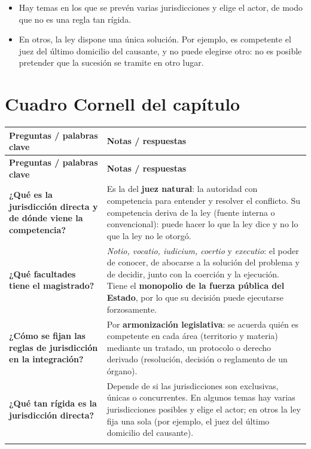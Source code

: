 \documentclass[12pt,oneside]{book}
\makeatletter
\newenvironment{cornell}{%
    \begin{longtable}{@{}>{\raggedright\arraybackslash}p{0.28\textwidth}>{\raggedright\arraybackslash}p{0.67\textwidth}@{}}
    \toprule
    \textbf{Preguntas / palabras clave} & \textbf{Notas / respuestas} \\
    \midrule
    \endfirsthead
    \toprule
    \textbf{Preguntas / palabras clave} & \textbf{Notas / respuestas} \\
    \midrule
    \endhead
}{%
    \end{longtable}
}
\newcommand{\cornellrow}[2]{\textbf{#1} & #2 \\[0.6em]}
\newcommand{\cornellresumen}[1]{%
    \midrule
    \multicolumn{2}{@{}p{\dimexpr0.95\textwidth+2\tabcolsep\relax}@{}}{\textbf{Resumen:} #1} \\
    \bottomrule
}
\makeatother
\begin{document}
\begin{itemize}
    \item Hay temas en los que se prevén varias jurisdicciones y elige el actor, de modo que no es una regla tan rígida.
    \item En otros, la ley dispone una única solución. Por ejemplo, es competente el juez del último domicilio del causante, y no puede elegirse otro: no es posible pretender que la sucesión se tramite en otro lugar.
\end{itemize}

\section{Cuadro Cornell del capítulo}

\begin{cornell}
\cornellrow{¿Qué es la jurisdicción directa y de dónde viene la competencia?}{Es la del \textbf{juez natural}: la autoridad con competencia para entender y resolver el conflicto. Su competencia deriva de la ley (fuente interna o convencional): puede hacer lo que la ley dice y no lo que la ley no le otorgó.}
\cornellrow{¿Qué facultades tiene el magistrado?}{\textit{Notio, vocatio, iudicium, coertio} y \textit{executio}: el poder de conocer, de abocarse a la solución del problema y de decidir, junto con la coerción y la ejecución. Tiene el \textbf{monopolio de la fuerza pública del Estado}, por lo que su decisión puede ejecutarse forzosamente.}
\cornellrow{¿Cómo se fijan las reglas de jurisdicción en la integración?}{Por \textbf{armonización legislativa}: se acuerda quién es competente en cada área (territorio y materia) mediante un tratado, un protocolo o derecho derivado (resolución, decisión o reglamento de un órgano).}
\cornellrow{¿Qué tan rígida es la jurisdicción directa?}{Depende de si las jurisdicciones son exclusivas, únicas o concurrentes. En algunos temas hay varias jurisdicciones posibles y elige el actor; en otros la ley fija una sola (por ejemplo, el juez del último domicilio del causante).}
\cornellresumen{La jurisdicción directa corresponde al juez natural, cuya competencia deriva de la ley y que conserva las facultades de conocer, decidir y ejecutar con el auxilio de la fuerza pública. En la integración, los Estados acuerdan por armonización legislativa quién es competente en cada materia y territorio, con mayor o menor rigidez según el tema.}
\end{cornell}

\end{document}

